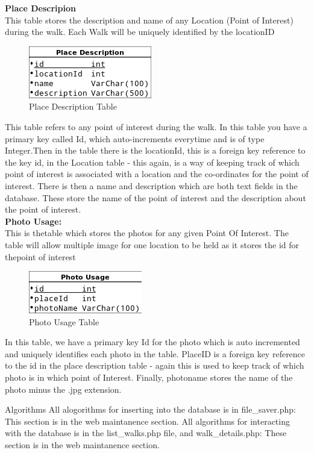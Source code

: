 \documentclass[12pt]{article}
\makeatletter
\renewcommand{\paragraph}{
  \@startsection{paragraph}{4}
  {\z@}{3.25ex \@plus -10em \@minus 1em}{0.1em}
  {\normalfont\normalsize\bfseries}
}
\makeatother
\begin{document}
	\indent\textbf{Place Descripion}~\\
	This table stores the description and name of any Location (Point of Interest) during the walk. Each Walk will be uniquely identified by the locationID
	\begin{figure}[htp]
\centering
\includegraphics[scale=0.60]{Final_report/PlaceDescription.png}
\caption{Place Description Table}
\label{Place Description Table}
\end{figure}
This table refers to any point of interest during the walk. In this table you have a primary key called Id, which auto-increments everytime and is of type Integer.Then in the table there is the locationId, this is a foreign key reference to the key id, in the Location table - this again, is a way of keeping track of which point of interest is associated with a location and the co-ordinates for the point of interest. There is then a name and description which are both text fields in the database. These store the name of the point of interest and the description about the point of interest.
	~\\
	\indent\textbf{Photo Usage:}~\\
	This is thetable which stores the photos for any given Point Of Interest. The table will allow multiple image for one location to be held as it stores the id for thepoint of interest
	\begin{figure}[htp]
\centering
\includegraphics[scale=0.70]{Final_report/Photo_Usage.png}
\caption{Photo Usage Table}
\label{Photo Usage Table}
\end{figure}
In this table, we have a primary key Id for the photo which is auto incremented and uniquely identifies each photo in the table. PlaceID is a foreign key reference to the id in the place description table - again this is used to keep track of which photo is in which point of Interest. Finally, photoname stores the name of the photo minus the .jpg extension.
\paragraph{Algorithms}
All alogorithms for inserting into the database is in file\_saver.php: This section is in the web maintanence section.
All algorithms for interacting with the database is in the list\_walks.php file, and walk\_details.php: These section is in the web maintanence section.
\end{document}
